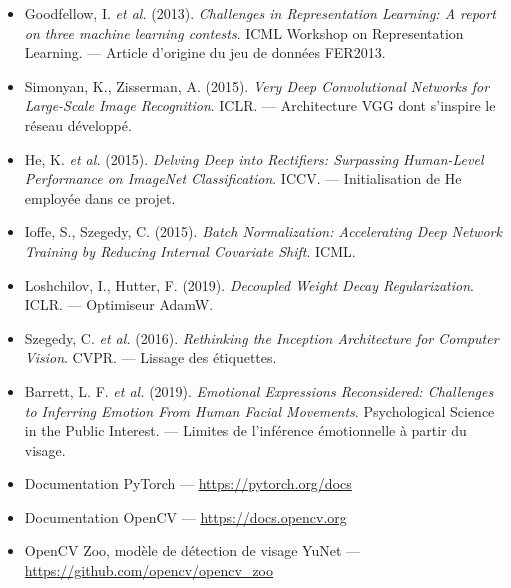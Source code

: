 \documentclass[a4paper,12pt]{report}
\begin{document}
\begin{itemize}[leftmargin=*,itemsep=4pt]
  \item Goodfellow, I. \textit{et al.} (2013). \emph{Challenges in
        Representation Learning: A report on three machine learning contests}.
        ICML Workshop on Representation Learning. --- Article d'origine du jeu de
        données FER2013.

  \item Simonyan, K., Zisserman, A. (2015). \emph{Very Deep Convolutional
        Networks for Large-Scale Image Recognition}. ICLR. --- Architecture VGG
        dont s'inspire le réseau développé.

  \item He, K. \textit{et al.} (2015). \emph{Delving Deep into Rectifiers:
        Surpassing Human-Level Performance on ImageNet Classification}. ICCV.
        --- Initialisation de He employée dans ce projet.

  \item Ioffe, S., Szegedy, C. (2015). \emph{Batch Normalization: Accelerating
        Deep Network Training by Reducing Internal Covariate Shift}. ICML.

  \item Loshchilov, I., Hutter, F. (2019). \emph{Decoupled Weight Decay
        Regularization}. ICLR. --- Optimiseur AdamW.

  \item Szegedy, C. \textit{et al.} (2016). \emph{Rethinking the Inception
        Architecture for Computer Vision}. CVPR. --- Lissage des étiquettes.

  \item Barrett, L. F. \textit{et al.} (2019). \emph{Emotional Expressions
        Reconsidered: Challenges to Inferring Emotion From Human Facial
        Movements}. Psychological Science in the Public Interest. --- Limites de
        l'inférence émotionnelle à partir du visage.

  \item Documentation PyTorch --- \url{https://pytorch.org/docs}

  \item Documentation OpenCV --- \url{https://docs.opencv.org}

  \item OpenCV Zoo, modèle de détection de visage YuNet ---
        \url{https://github.com/opencv/opencv_zoo}
\end{itemize}
\end{document}
